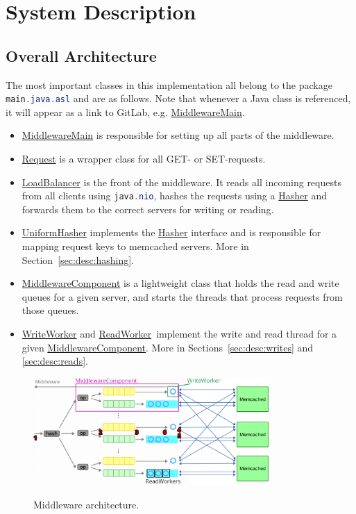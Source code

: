 \documentclass[11pt]{article}
\newcommand{\code}[1]{\lstinline[language=Java]{#1}}
\newcommand{\linkmain}[1]{\href{https://gitlab.inf.ethz.ch/pungast/asl-fall16-project/blob/master/src/main/java/asl/#1.java}{#1}}
\begin{document}
\section{System Description}\label{sec:system-description}

\subsection{Overall Architecture}\label{sec:desc:architecture}

The most important classes in this implementation all belong to the package \code{main.java.asl} and are as follows. Note that whenever a Java class is referenced, it will appear as a link to GitLab, e.g. \linkmain{MiddlewareMain}. 

\begin{itemize}
\item \linkmain{MiddlewareMain} is responsible for setting up all parts of the middleware.
\item \linkmain{Request} is a wrapper class for all GET- or SET-requests.
\item \linkmain{LoadBalancer} is the front of the middleware. It reads all incoming requests from all clients using \code{java.nio}, hashes the requests using a \linkmain{Hasher} and forwards them to the correct servers for writing or reading.
\item \linkmain{UniformHasher} implements the \linkmain{Hasher} interface and is responsible for mapping request keys to memcached servers. More in Section~\ref{sec:desc:hashing}.
\item \linkmain{MiddlewareComponent} is a lightweight class that holds the read and write queues for a given server, and starts the threads that process requests from those queues.
\item \linkmain{WriteWorker} and \linkmain{ReadWorker} implement the write and read thread for a given \linkmain{MiddlewareComponent}. More in Sections~\ref{sec:desc:writes} and \ref{sec:desc:reads}.
\end{itemize}

\begin{figure}[h]
\centering
\includegraphics[width=0.8\textwidth]{figures/structure.png}
\label{fig:structure}
\caption{Middleware architecture.}
\end{figure}
\end{document}
